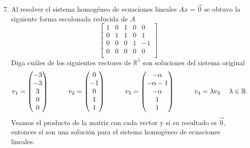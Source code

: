 \documentclass{article}
\begin{document}
\maketitle

\begin{enumerate}
    \setcounter{enumi}{6}
    \item Al resolver el sistema homogéneo de ecuaciones lineales \(Ax = \vec{0}\) se obtuvo la siguiente forma escalonada reducida de \(A\)
        \[
            \begin{bmatrix}
                1 & 0 & 1 & 0 & 0 \\
                0 & 1 & 1 & 0 & 1 \\
                0 & 0 & 0 & 1 & -1 \\
                0 & 0 & 0 & 0 & 0 \\
            \end{bmatrix}
        \]
        Diga cuáles de los siguientes vectores de \(\mathbb{R}^5\) son soluciones del sistema original
        \[
            v_1 = 
            \begin{pmatrix}
                -3 \\ -3 \\ 3 \\ 0 \\ 0
            \end{pmatrix}
            \hspace{1cm}
            v_2 = 
            \begin{pmatrix}
                0 \\ -1 \\ 0 \\ 1 \\ 1
            \end{pmatrix}
            \hspace{1cm}
            v_3 = 
            \begin{pmatrix}
                -\alpha \\ -\alpha - 1 \\ -\alpha \\ 1 \\ 1
            \end{pmatrix}
            \hspace{1cm}
            v_4 = \lambda v_3 \hspace{3ex} \lambda \in \mathbb{R}
        \]
        Veamos el producto de la matriz con cada vector y si su resultado es \(\vec{0}\), entonces sí son una solución para el sistema homogéneo de ecuaciones lineales.

\end{enumerate}
\end{document}
